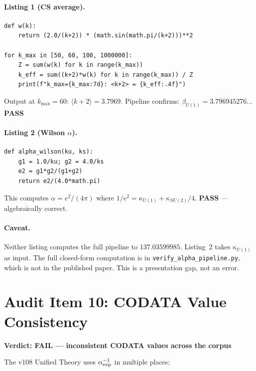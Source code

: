 \documentclass[11pt]{article}
\newcommand{\PASS}{\textcolor{pass}{\textbf{PASS}}}
\newcommand{\FAIL}{\textcolor{fail}{\textbf{FAIL}}}
\begin{document}
\paragraph{Listing 1 (CS average).}
\begin{verbatim}
def w(k):
    return (2.0/(k+2)) * (math.sin(math.pi/(k+2)))**2

for k_max in [50, 60, 100, 1000000]:
    Z = sum(w(k) for k in range(k_max))
    k_eff = sum((k+2)*w(k) for k in range(k_max)) / Z
    print(f"k_max={k_max:7d}: <k+2> = {k_eff:.4f}")
\end{verbatim}
Output at $k_{\max}=60$: $\langle k+2 \rangle = 3.7969$.
Pipeline confirms: $\beta_{U(1)} = 3.796945276\ldots$ \PASS

\paragraph{Listing 2 (Wilson $\alpha$).}
\begin{verbatim}
def alpha_wilson(ku, ks):
    g1 = 1.0/ku; g2 = 4.0/ks
    e2 = g1*g2/(g1+g2)
    return e2/(4.0*math.pi)
\end{verbatim}
This computes $\alpha = e^2/(4\pi)$ where $1/e^2 = \kappa_{U(1)} + \kappa_{SU(2)}/4$.
\PASS{} --- algebraically correct.

\paragraph{Caveat.}
Neither listing computes the full pipeline to $137.03599985$. Listing~2 takes
$\kappa_{U(1)}$ as input. The full closed-form computation is in
\texttt{verify\_alpha\_pipeline.py}, which is not in the published paper.
This is a presentation gap, not an error.

\section{Audit Item 10: CODATA Value Consistency}

\textbf{Verdict: \FAIL{} --- inconsistent CODATA values across the corpus}

\medskip
The v108 Unified Theory uses $\alpha^{-1}_{\rm exp}$ in multiple places:
\end{document}
